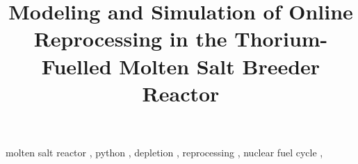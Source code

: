 \documentclass[review]{elsarticle}
\begin{document}
\begin{frontmatter}
\title{Modeling and Simulation of Online Reprocessing in the Thorium-Fuelled Molten Salt Breeder Reactor}

\date{}                     %





\begin{keyword}
molten salt reactor \sep
python \sep 
depletion \sep 
reprocessing \sep 
nuclear fuel cycle \sep
\end{keyword}


\end{frontmatter}
\glsresetall

\linenumbers


\FloatBarrier

\FloatBarrier

\FloatBarrier

\FloatBarrier

\FloatBarrier

\FloatBarrier

\nocite{robertson_conceptual_1971} %

\end{document}
